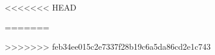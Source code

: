 \documentclass[11pt,fleqn]{book} %
\begin{document}

<<<<<<< HEAD

=======

>>>>>>> feb34ee015c2e7337f28b19c6a5da86cd2e1c743


%
%







%

\end{document}
